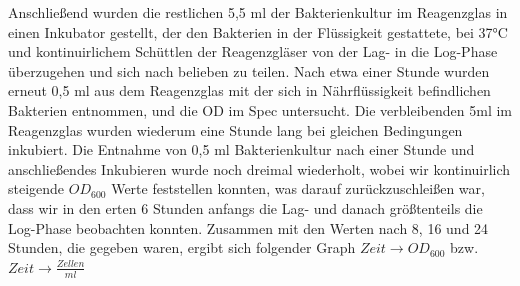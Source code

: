 \documentclass[12pt,twoside]{article}
\begin{document}
Anschließend wurden die restlichen 5,5 ml der Bakterienkultur im Reagenzglas in einen Inkubator gestellt, der den Bakterien in der Flüssigkeit gestattete, bei 37°C und kontinuirlichem Schüttlen der Reagenzgläser von der Lag- in die Log-Phase überzugehen und sich nach belieben zu teilen. Nach etwa einer Stunde wurden erneut 0,5 ml aus dem Reagenzglas mit der sich in Nährflüssigkeit befindlichen Bakterien entnommen, und die OD im Spec untersucht. Die verbleibenden 5ml im Reagenzglas wurden wiederum eine Stunde lang bei gleichen Bedingungen inkubiert. Die Entnahme von 0,5 ml Bakterienkultur nach einer Stunde und anschließendes Inkubieren wurde noch dreimal wiederholt, wobei wir kontinuirlich steigende $OD_{600}$ Werte feststellen konnten, was darauf zurückzuschleißen war, dass wir in den erten 6 Stunden anfangs die Lag- und danach größtenteils die Log-Phase beobachten konnten. Zusammen mit den Werten nach 8, 16 und 24 Stunden, die gegeben waren, ergibt sich folgender Graph $Zeit \rightarrow OD_{600}$ bzw. $Zeit \rightarrow \frac{Zellen}{ml}$
\end{document}
